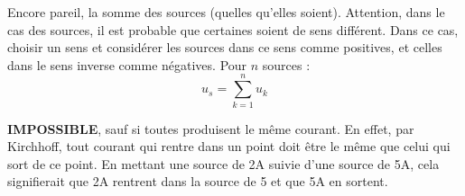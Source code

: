 \documentclass[12pt,a4paper]{article}
\begin{document}
\begin{boite}
	 Encore pareil, la somme des sources (quelles qu'elles soient). Attention, dans le cas des sources, il est probable que certaines soient de sens différent. Dans ce cas, choisir un sens et considérer les sources dans ce sens comme positives, et celles dans le sens inverse comme négatives. Pour $n$ sources :
	\begin{equation}
		u_{s} = \sum_{k=1}^n u_k
	\end{equation}		
\end{boite}
\begin{boite}
	 \textbf{IMPOSSIBLE}, sauf si toutes produisent le même courant. En effet, par Kirchhoff, tout courant qui rentre dans un point doit être le même que celui qui sort de ce point. En mettant une source de 2A suivie d'une source de 5A, cela signifierait que 2A rentrent dans la source de 5 et que 5A en sortent. 
\end{boite}
\end{document}
